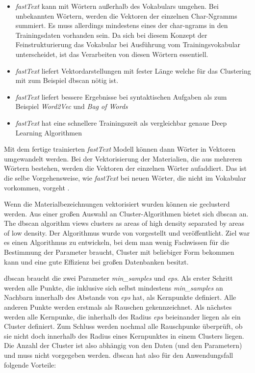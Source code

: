 \begin{itemize}
	\item \textit{fastText} kann mit Wörtern außerhalb des Vokabulars umgehen. Bei unbekannten Wörtern, werden die Vektoren der einzelnen Char-Ngramms summiert. Es muss allerdings mindestens eines der char-ngrams in den Trainingsdaten vorhanden sein. \citep{gensim_fastText,le2014distributed} Da sich bei diesem Konzept der Feinstrukturierung das Vokabular bei Ausführung vom Trainingsvokabular unterscheidet, ist das Verarbeiten von diesen Wörtern essentiell.
	\item \textit{fastText} liefert Vektordarstellungen mit fester Länge welche für das Clustering mit zum Beispiel \ac{dbscan} nötig ist. \citep{le2014distributed}
	\item \textit{fastText} liefert bessere Ergebnisse bei syntaktischen Aufgaben als zum Beispiel \textit{Word2Vec} und \textit{Bag of Words} \citep{fastText_word2vec_comparison,le2014distributed}
	\item \textit{fastText} hat eine schnellere Trainingszeit als vergleichbar genaue Deep Learning Algorithmen \citep{fastText_release2016}
\end{itemize}


Mit dem fertige trainierten \textit{fastText} Modell können dann Wörter in Vektoren umgewandelt werden. Bei der Vektorisierung der Materialien, die aus mehreren Wörtern bestehen, werden die Vektoren der einzelnen Wörter aufaddiert. Das ist die selbe Vorgehensweise, wie \textit{fastText} bei neuen Wörter, die nicht im Vokabular vorkommen, vorgeht \citep{gensim_fastText}.


Wenn die Materialbezeichnungen vektorisiert wurden können sie geclusterd werden. Aus einer großen Auswahl an Cluster-Algorithmen bietet sich \ac{dbscan} an. \glqq The \ac{dbscan} algorithm views clusters as areas of high density separated by areas of low density.\grqq{} \citep{scikitlearn_clustering} Der Algorithmus wurde \citeyear{Ester1996ADA} von \citeauthor{Ester1996ADA} vorgestellt und veröffentlicht. Ziel war es einen Algorithmus zu entwickeln, bei dem man wenig Fachwissen für die Bestimmung der Parameter braucht, Cluster mit beliebiger Form bekommen kann und eine gute Effizienz bei großen Datenbanken besitzt.

\ac{dbscan} braucht die zwei Parameter \textit{min\_samples} und \textit{eps}. Als erster Schritt werden alle Punkte, die inklusive sich selbst mindestens \textit{min\_samples} an Nachbarn innerhalb des Abstands von \textit{eps} hat, als Kernpunkte definiert. Alle anderen Punkte werden erstmals als Rauschen gekennzeichnet. Als nächstes werden alle Kernpunke, die inherhalb des Radius \textit{eps} beieinander liegen als ein Cluster definiert. Zum Schluss werden nochmal alle Rauschpunke überprüft, ob sie nicht doch innerhalb des Radius eines Kernpunktes in einem Clusters liegen. \citep{scikitlearn_clustering,Ester1996ADA} Die Anzahl der Cluster ist also abhängig von den Daten (und den Parametern) und muss nicht vorgegeben werden.
\ac{dbscan} hat also für den Anwendungsfall folgende Vorteile:

